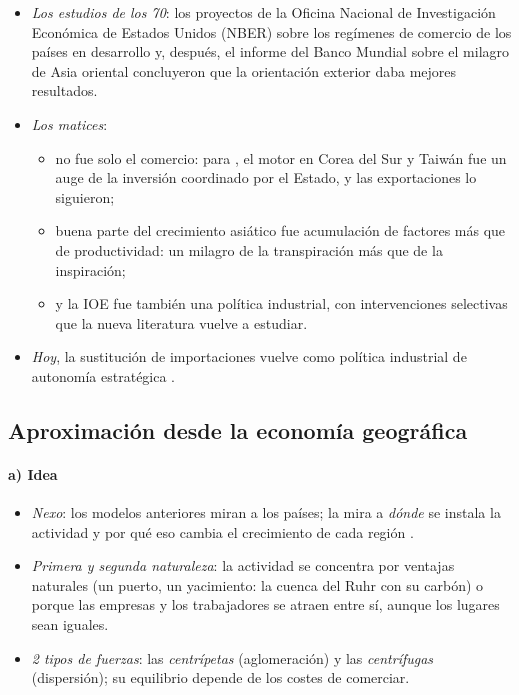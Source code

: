 \documentclass[11pt]{article}
\begin{document}
\begin{itemize}
\item \emph{Los estudios de los 70}: los proyectos de la Oficina Nacional de Investigación Económica de Estados Unidos (NBER) sobre los regímenes de comercio de los países en desarrollo\nocite{Bhagwati1978Anatomy,Krueger1978Foreign} y, después, el informe del Banco Mundial sobre el milagro de Asia oriental\nocite{BM1993Milagro} concluyeron que la orientación exterior daba mejores resultados.
\item \emph{Los matices}:
  \begin{itemize}
  \item no fue solo el comercio: para \textcite{Rodrik1995Getting}, el motor en Corea del Sur y Taiwán fue un auge de la inversión coordinado por el Estado, y las exportaciones lo siguieron;
  \item buena parte del crecimiento asiático fue acumulación de factores más que de productividad\nocite{Young1995}: un milagro de la transpiración más que de la inspiración\nocite{Krugman1994Myth};
  \item y la IOE fue también una política industrial, con intervenciones selectivas que la nueva literatura vuelve a estudiar\nocite{JuhaszLaneRodrik2024}.
  \end{itemize}
\item \emph{Hoy}, la sustitución de importaciones vuelve como política industrial de autonomía estratégica\nocite{Irwin2021} .
\end{itemize}

\subsection{Aproximación desde la economía geográfica}\label{sec:geografia}

\paragraph{a) Idea}

\begin{itemize}
\item \emph{Nexo}: los modelos anteriores miran a los países; la  mira a \emph{dónde} se instala la actividad y por qué eso cambia el crecimiento de cada región\nocite{Krugman1991Geography} .
\item \emph{Primera y segunda naturaleza}: la actividad se concentra por ventajas naturales (un puerto, un yacimiento: la cuenca del Ruhr con su carbón) o porque las empresas y los trabajadores se atraen entre sí, aunque los lugares sean iguales.
\item \emph{2 tipos de fuerzas}: las \emph{centrípetas} (aglomeración) y las \emph{centrífugas} (dispersión); su equilibrio depende de los costes de comerciar\nocite{FujitaKrugmanVenables1999Spatial}.
\end{itemize}
\end{document}
